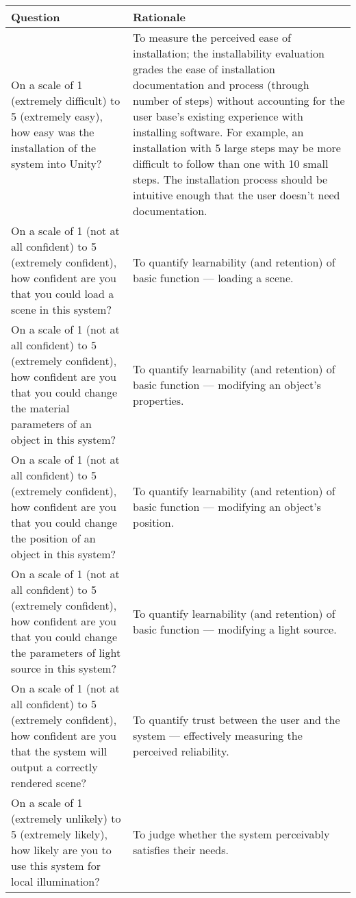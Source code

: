 \documentclass[12pt, titlepage]{article}
\begin{document}
\begin{tabular}{p{8cm}|p{8cm}}
	\hline
	\textbf{Question} & \textbf{Rationale} \\
	\hline
	On a scale of 1 (extremely difficult) to 5 (extremely easy), how easy was 
	the installation of the system into Unity? & To measure the perceived ease 
	of installation; the installability evaluation grades the ease of 
	installation documentation and process (through number of steps) without 
	accounting for the user base's existing experience with installing 
	software. For example, an installation with 5 large steps may be more 
	difficult to follow than one with 10 small steps. The installation process 
	should be intuitive enough that the user doesn't need documentation.\\
	On a scale of 1 (not at all confident) to 5 (extremely confident), how 
	confident are you that you could load a scene in this system? & To quantify 
	learnability (and retention) of basic function --- loading a scene. \\
	On a scale of 1 (not at all confident) to 5 (extremely confident), how 
	confident are you that you could change the material parameters of an 
	object in this system? & To quantify learnability (and retention) of basic 
	function --- modifying an object's properties. \\
	On a scale of 1 (not at all confident) to 5 (extremely confident), how 
	confident are you that you could change the position of an object in this 
	system? & To quantify learnability (and retention) of basic function --- 
	modifying an object's position. \\	
	On a scale of 1 (not at all confident) to 5 (extremely confident), how 
	confident are you that you could change the parameters of light source in 
	this system? & To quantify learnability (and retention) of basic function 
	--- modifying a light source. \\	
	On a scale of 1 (not at all confident) to 5 (extremely confident), how 
	confident are you that the system will output a correctly rendered scene? & 
	To quantify trust between the user and the system --- effectively measuring 
	the perceived reliability. \\
	On a scale of 1 (extremely unlikely) to 5 (extremely likely), how 
	likely are you to use this system for local illumination? & To judge 
	whether the system perceivably satisfies their needs. \\
	\hline
\end{tabular}
\end{document}
